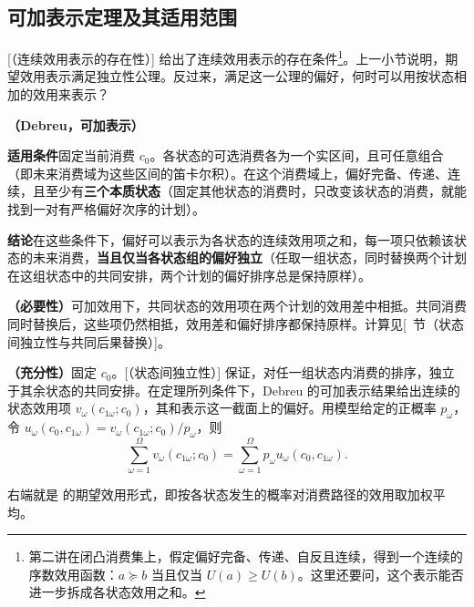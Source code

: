\subsection{可加表示定理及其适用范围}
[（连续效用表示的存在性）] 给出了连续效用表示的存在条件\footnote{第二讲在闭凸消费集上，假定偏好完备、传递、自反且连续，得到一个连续的序数效用函数：$a\succeq b$ 当且仅当 $U(a)\ge U(b)$。这里还要问，这个表示能否进一步拆成各状态效用之和。}。上一小节说明，期望效用表示满足独立性公理。反过来，满足这一公理的偏好，何时可以用按状态相加的效用来表示？

\begin{tcolorbox}[knowledge]
\textbf{（Debreu，可加表示）}

\textbf{适用条件}\quad 固定当前消费 $c_0$。各状态的可选消费各为一个实区间，且可任意组合（即未来消费域为这些区间的笛卡尔积）。在这个消费域上，偏好完备、传递、连续，且至少有\textbf{三个本质状态}（固定其他状态的消费时，只改变该状态的消费，就能找到一对有严格偏好次序的计划）。

\textbf{结论}\quad 在这些条件下，偏好可以表示为各状态的连续效用项之和，每一项只依赖该状态的未来消费，\textbf{当且仅当各状态组的偏好独立}（任取一组状态，同时替换两个计划在这组状态中的共同安排，两个计划的偏好排序总是保持原样）。
\end{tcolorbox}
\begin{solution}[label-content={证明},blank-type=none]
\textbf{（必要性）}可加效用下，共同状态的效用项在两个计划的效用差中相抵。共同消费同时替换后，这些项仍然相抵，效用差和偏好排序都保持原样。计算见[~节（状态间独立性与共同后果替换）]。

\textbf{（充分性）}固定 $c_0$。[（状态间独立性）] 保证，对任一组状态内消费的排序，独立于其余状态的共同安排。在定理所列条件下，Debreu 的可加表示结果给出连续的状态效用项 $v_\omega(c_{1\omega};c_0)$，其和表示这一截面上的偏好。用模型给定的正概率 $p_\omega$，令 $u_\omega(c_0,c_{1\omega})=v_\omega(c_{1\omega};c_0)/p_\omega$，则
\[
 \sum_{\omega=1}^{\Omega} v_\omega(c_{1\omega};c_0)
 =\sum_{\omega=1}^{\Omega}p_\omega u_\omega(c_0,c_{1\omega}).
\]

右端就是 的期望效用形式，即按各状态发生的概率对消费路径的效用取加权平均。
\end{solution}

